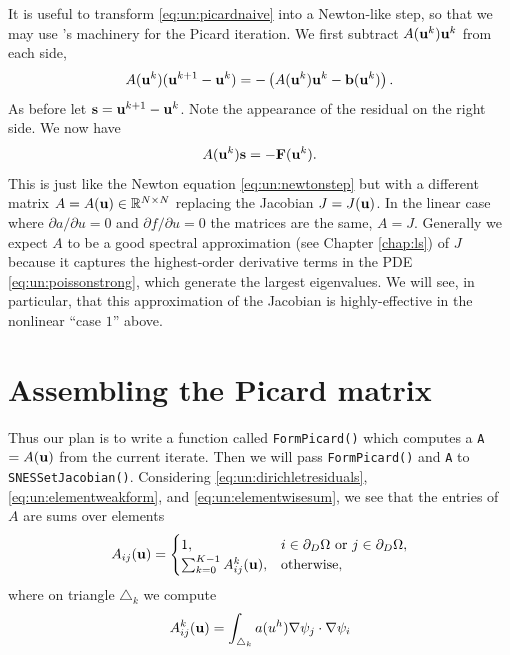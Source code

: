 It is useful to transform \eqref{eq:un:picardnaive} into a Newton-like step, so that we may use \PETSc's \pSNES machinery for the Picard iteration.  We first subtract $A(\mathbf{u}^k) \mathbf{u}^k$ from each side,
\begin{equation*}
A(\mathbf{u}^k) (\mathbf{u}^{k+1}-\mathbf{u}^k) = - \left(A(\mathbf{u}^k) \mathbf{u}^k - \mathbf{b}(\mathbf{u}^k)\right).
\end{equation*}
As before let $\mathbf{s} = \mathbf{u}^{k+1}-\mathbf{u}^k$.  Note the appearance of the residual on the right side.  We now have
\begin{equation}
A(\mathbf{u}^k) \mathbf{s} = -\mathbf{F}(\mathbf{u}^k).  \label{eq:un:picardstep}
\end{equation}
This is just like the Newton equation \eqref{eq:un:newtonstep} but with a different matrix $A=A(\mathbf{u})\in\mathbb{R}^{N\times N}$ replacing the Jacobian $J=J(\mathbf{u})$.  In the linear case where $\partial a/\partial u=0$ and $\partial f/\partial u=0$ the matrices are the same, $A=J$.  Generally we expect $A$ to be a good spectral approximation (see Chapter \ref{chap:ls}) of $J$ because it captures the highest-order derivative terms in the PDE \eqref{eq:un:poissonstrong}, which generate the largest eigenvalues.  We will see, in particular, that this approximation of the Jacobian is highly-effective in the nonlinear ``case $1$'' above.


\section{Assembling the Picard matrix}

Thus our plan is to write a function called \texttt{FormPicard()} which computes a \pMat \texttt{A} $=A(\mathbf{u})$ from the current iterate.  Then we will pass \texttt{FormPicard()} and \texttt{A} to \texttt{SNESSetJacobian()}.  Considering \eqref{eq:un:dirichletresiduals}, \eqref{eq:un:elementweakform}, and \eqref{eq:un:elementwisesum}, we see that the entries of $A$ are sums over elements
\begin{equation}
A_{ij}(\mathbf{u}) =  \begin{cases}
               1, & i \in \partial_D\Omega \text{ or } j \in \partial_D\Omega, \\
               \sum_{k=0}^{K-1} A_{ij}^k(\mathbf{u}), & \text{otherwise},
               \end{cases} \label{eq:un:picardentry}
\end{equation}
where on triangle $\triangle_k$ we compute
\begin{equation}
A_{ij}^k(\mathbf{u}) = \int_{\triangle_k} a(u^h) \nabla\psi_j \cdot \nabla\psi_i \label{eq:un:picardentryelement}
\end{equation}

